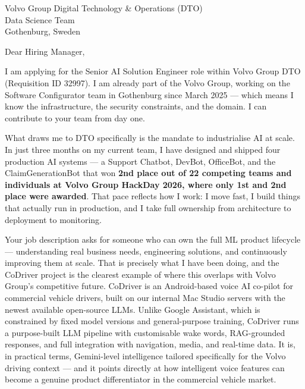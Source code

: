 \documentclass[a4paper,10pt]{article}
\begin{document}
\pagestyle{empty}

\begin{letter}{
  \color{darkblue}
  Volvo Group Digital Technology \& Operations (DTO)\\
  Data Science Team\\
  Gothenburg, Sweden
}

\vspace{30pt}

\opening{Dear Hiring Manager,}

\vspace{8pt}

I am applying for the Senior AI Solution Engineer role within Volvo Group DTO
(Requisition ID 32997). I am already part of the Volvo Group, working on the Software
Configurator team in Gothenburg since March 2025 --- which means I know the
infrastructure, the security constraints, and the domain. I can contribute to your
team from day one.

What draws me to DTO specifically is the mandate to industrialise AI at scale. In just
three months on my current team, I have designed and shipped four production AI
systems --- a Support Chatbot, DevBot, OfficeBot, and the ClaimGenerationBot that won
\textbf{2nd place out of 22 competing teams and individuals at Volvo Group HackDay
2026, where only 1st and 2nd place were awarded}. That pace reflects how I work: I
move fast, I build things that actually run in production, and I take full ownership
from architecture to deployment to monitoring.

Your job description asks for someone who can own the full ML product lifecycle ---
understanding real business needs, engineering solutions, and continuously improving
them at scale. That is precisely what I have been doing, and the CoDriver project is
the clearest example of where this overlaps with Volvo Group's competitive future.
CoDriver is an Android-based voice AI co-pilot for commercial vehicle drivers, built
on our internal Mac Studio servers with the newest available open-source LLMs. Unlike
Google Assistant, which is constrained by fixed model versions and general-purpose
training, CoDriver runs a purpose-built LLM pipeline with customisable wake words,
RAG-grounded responses, and full integration with navigation, media, and real-time
data. It is, in practical terms, Gemini-level intelligence tailored specifically for
the Volvo driving context --- and it points directly at how intelligent voice features
can become a genuine product differentiator in the commercial vehicle market.


\end{letter}
\end{document}
